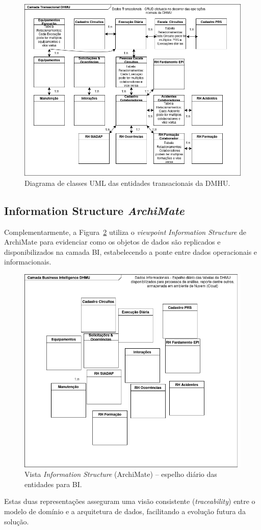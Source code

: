 \documentclass[12pt,a4paper,final]{article}
\begin{document}
    \begin{figure}[H]
        \centering
        \includegraphics[width=\textwidth]{UML}
        \caption{Diagrama de classes UML das entidades transacionais da DMHU.}
        \label{fig:uml-detalhado}
    \end{figure}

    \subsection*{Information Structure \textit{ArchiMate}}\label{subsec:information-structure-archimate}
    Complementarmente, a Figura~\ref{fig:archi-info} utiliza o
    \textit{viewpoint} \emph{Information Structure} de ArchiMate para evidenciar
    como os objetos de dados são replicados e disponibilizados na camada BI,
    estabelecendo a ponte entre dados operacionais e informacionais.

    \begin{figure}[H]
        \centering
        \includegraphics[width=\textwidth]{CAMADA}
        \caption{Vista \textit{Information Structure} (ArchiMate) – espelho diário das
        entidades para BI.}
        \label{fig:archi-info}
    \end{figure}

    Estas duas representações asseguram uma visão consistente
    (\emph{traceability}) entre o modelo de domínio e a arquitetura de dados,
    facilitando a evolução futura da solução.

    \newpage
    \nocite{*}
    \printbibliography
\end{document}
